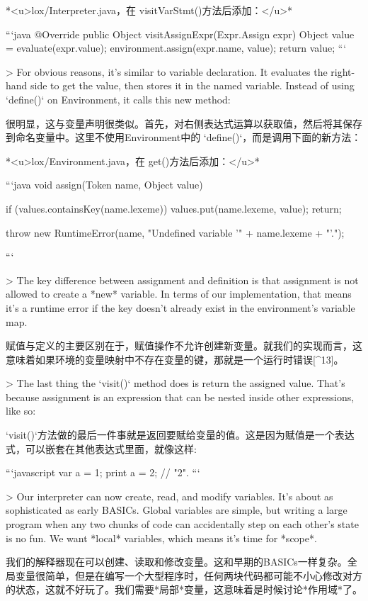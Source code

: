 \documentclass[cn,11pt,chinese]{elegantbook}
\begin{document}
{{{{{{{*<u>lox/Interpreter.java，在 visitVarStmt()方法后添加：</u>*

```java
  @Override
  public Object visitAssignExpr(Expr.Assign expr) {
    Object value = evaluate(expr.value);
    environment.assign(expr.name, value);
    return value;
  }
```

> For obvious reasons, it’s similar to variable declaration. It evaluates the right-hand side to get the value, then stores it in the named variable. Instead of using `define()` on Environment, it calls this new method:

很明显，这与变量声明很类似。首先，对右侧表达式运算以获取值，然后将其保存到命名变量中。这里不使用Environment中的 `define()`，而是调用下面的新方法：

*<u>lox/Environment.java，在 get()方法后添加：</u>*

```java
  void assign(Token name, Object value) {
    if (values.containsKey(name.lexeme)) {
      values.put(name.lexeme, value);
      return;
    }

    throw new RuntimeError(name,
        "Undefined variable '" + name.lexeme + "'.");
  }
```

> The key difference between assignment and definition is that assignment is not allowed to create a *new* variable. In terms of our implementation, that means it’s a runtime error if the key doesn’t already exist in the environment’s variable map.

赋值与定义的主要区别在于，赋值操作不允许创建新变量。就我们的实现而言，这意味着如果环境的变量映射中不存在变量的键，那就是一个运行时错误[^13]。

> The last thing the `visit()` method does is return the assigned value. That’s because assignment is an expression that can be nested inside other expressions, like so:

`visit()`方法做的最后一件事就是返回要赋给变量的值。这是因为赋值是一个表达式，可以嵌套在其他表达式里面，就像这样:

```javascript
var a = 1;
print a = 2; // "2".
```

> Our interpreter can now create, read, and modify variables. It’s about as sophisticated as early BASICs. Global variables are simple, but writing a large program when any two chunks of code can accidentally step on each other’s state is no fun. We want *local* variables, which means it’s time for *scope*.

我们的解释器现在可以创建、读取和修改变量。这和早期的BASICs一样复杂。全局变量很简单，但是在编写一个大型程序时，任何两块代码都可能不小心修改对方的状态，这就不好玩了。我们需要*局部*变量，这意味着是时候讨论*作用域*了。

}}}}}}}
\end{document}
